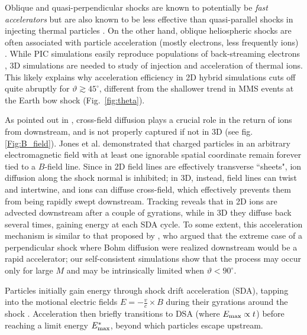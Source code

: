 \documentclass[varenna]{cimento}
\newcommand\thbn{\vartheta}
\renewcommand{\deg}{^{\circ}}
\newcommand{\Em}{E_{\rm max}}
\begin{document}
Oblique and quasi-perpendicular shocks are known to potentially be \emph{fast accelerators} \cite{jokipii87,giacalone+94} but are also known to be less effective than quasi-parallel shocks in injecting thermal particles \cite{schwartz+83,caprioli+15,caprioli+14a}.
On the other hand, oblique heliospheric shocks are often associated with particle acceleration (mostly electrons, less frequently ions) \cite{zank+06,zank+07}.
While PIC simulations easily reproduce populations of back-streaming electrons \cite{amano+07,xu+20,guo+14a,guo+14b,morris+23,ha+21,ha+22,bohdan+19a,bohdan+21,amano+22,matsumoto+15}, 3D simulations are needed to study of injection and acceleration of thermal ions.
This likely explains why acceleration efficiency in 2D hybrid simulations cuts off quite abruptly for $\thbn\gtrsim 45\deg$, different from the shallower trend in MMS events at the Earth bow shock (Fig.~\ref{fig:theta}).
 
As pointed out in \cite{jokipii+93,jones+98,giacalone+00}, cross-field diffusion plays a crucial role in the return of ions from downstream, and is not properly captured if not in 3D (see fig. \ref{Fig:B_field}).
Jones et al. \cite{jones+98} demonstrated that charged particles in an arbitrary electromagnetic field with at least one ignorable spatial coordinate remain forever tied to a $B$-field line.
Since in 2D field lines are effectively transverse ``sheets", ion diffusion along the shock normal is inhibited;
in 3D, instead, field lines can twist and intertwine, and ions can diffuse cross-field, which effectively prevents them from being rapidly swept downstream.
Tracking reveals that in 2D ions are advected downstream after a couple of gyrations, while in 3D they diffuse back several times, gaining energy at each SDA cycle. 
To some extent, this acceleration mechanism is similar to that proposed by \cite{kamijima+20}, who argued that the extreme case of a perpendicular shock where Bohm diffusion were realized downstream would be a rapid accelerator;
our self-consistent simulations show that the process may occur only for large $M$ and may be intrinsically limited when $\thbn<90\deg$.



Particles initially gain energy through shock drift acceleration (SDA), tapping into the motional electric fields $E=- \frac{v}{c} \times B$ during their gyrations around the shock \cite{chen+75,ball+01}.
Acceleration then briefly transitions to DSA (where $\Em\propto t$) before reaching a limit energy $\Em^*$, beyond which particles escape upstream. 
\end{document}
